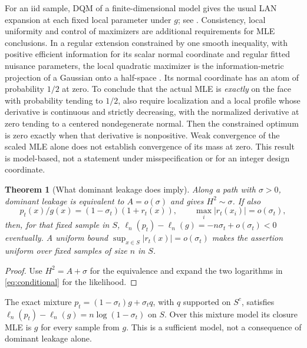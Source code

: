 \documentclass[11pt]{article}
\newtheorem{theorem}{Theorem}
\theoremstyle{definition}
\theoremstyle{remark}
\begin{document}
For an iid sample, DQM of a finite-dimensional model gives the usual LAN
expansion at each fixed local parameter under $g$; see \cite[Theorem 7.2]{vdv}.
Consistency, local uniformity and control of maximizers are additional
requirements for MLE conclusions. In a regular extension constrained by one
smooth inequality, with positive efficient information for its scalar normal
coordinate and regular fitted nuisance parameters, the local quadratic
maximizer is the information-metric projection of a Gaussian onto a
half-space \cite{chernoff,selfliang}. Its normal coordinate has an atom of
probability $1/2$ at zero. To conclude that the actual MLE is \emph{exactly}
on the face with probability tending to $1/2$, also require localization and
a local profile whose derivative is continuous and strictly decreasing,
with the normalized derivative at zero tending to a centered nondegenerate
normal. Then the constrained optimum is zero exactly when that derivative
is nonpositive. Weak convergence of the scaled MLE alone does not establish
convergence of its mass at zero. This result is model-based, not a statement
under misspecification or for an integer design coordinate.

\begin{theorem}[What dominant leakage does imply]\label{th:leak}
Along a path with $\sigma>0$, dominant leakage is equivalent to $A=o(\sigma)$
and gives $H^2\sim\sigma$. If also
\begin{equation}\label{eq:conditional}
 p_t(x)/g(x)=(1-\sigma_t)(1+r_t(x)),\qquad
 \max_i|r_t(x_i)|=o(\sigma_t),
\end{equation}
then, for that fixed sample in $S$,
$\ell_n(p_t)-\ell_n(g)=-n\sigma_t+o(\sigma_t)<0$ eventually.
A uniform bound $\sup_{x\in S}|r_t(x)|=o(\sigma_t)$ makes the assertion
uniform over fixed samples of size $n$ in $S$.
\end{theorem}
\begin{proof}
Use $H^2=A+\sigma$ for the equivalence and expand the two logarithms in
\eqref{eq:conditional} for the likelihood.
\end{proof}
The exact mixture $p_t=(1-\sigma_t)g+\sigma_t q$, with $q$ supported on
$S^c$, satisfies $\ell_n(p_t)-\ell_n(g)=n\log(1-\sigma_t)$ on $S$.
Over this mixture model its closure MLE is $g$ for every sample from $g$.
This is a sufficient model, not a consequence of dominant leakage alone.
\end{document}
